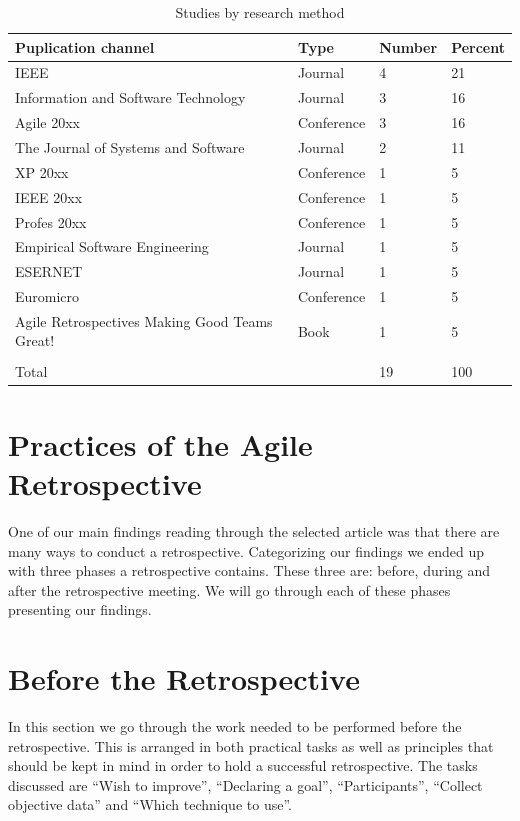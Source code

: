 \documentclass[12pt]{article}
\begin{document}
\begin{table}[!h]
	\centering
	\caption{Studies by research method}
	\label{table:studies-publications}
	\begin{tabular}{ p{} p{} p{} p{}}
		\hline
		Puplication channel & Type & Number & Percent \\ \hline
		IEEE & Journal & 4 & 21 \\
		Information and Software Technology & Journal & 3 & 16 \\
		Agile 20xx & Conference & 3 & 16 \\
		The Journal of Systems and Software & Journal & 2 & 11 \\
		XP 20xx & Conference & 1 & 5 \\
		IEEE  20xx & Conference & 1 & 5 \\
		Profes 20xx & Conference & 1 & 5 \\
		Empirical Software Engineering & Journal & 1 & 5 \\
		ESERNET & Journal & 1 & 5 \\
		Euromicro & Conference & 1 & 5 \\
		Agile Retrospectives Making Good Teams Great! & Book & 1 & 5 \\
		\\
		Total & & 19 & 100 \\ \hline
	\end{tabular}
\end{table}

\section{Practices of the Agile Retrospective}
One of our main findings reading through the selected article was that there are many ways to conduct a retrospective. Categorizing our findings we ended up with three phases a retrospective contains. These three are: before, during and after the retrospective meeting. We will go through each of these phases presenting our findings.

\section{Before the Retrospective}
In this section we go through the work needed to be performed before the retrospective. This is arranged in both practical tasks as well as principles that should be kept in mind in order to hold a successful retrospective. The tasks discussed are ``Wish to improve'', ``Declaring a goal'', ``Participants'', ``Collect objective data'' and ``Which technique to use''. 
\end{document}
